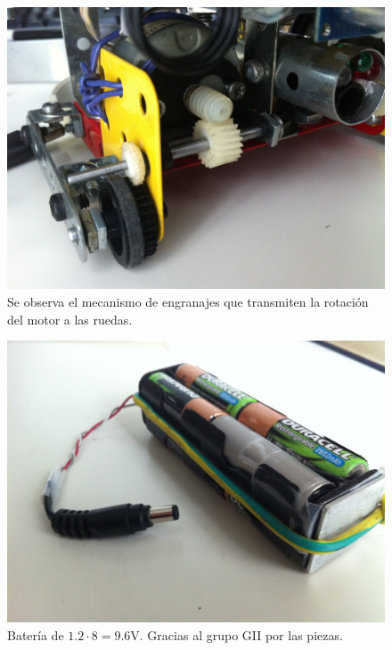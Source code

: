 \documentclass[10pt,a4paper,hidelinks,twocolumn,nobalancelastpage]{article}
\begin{document}
\begin{figure}[H]
\includegraphics[width=\columnwidth]{motor.jpg}
\caption{Se observa el mecanismo de engranajes que transmiten la rotación del 
motor a las ruedas. \label{fig:motor}}
\end{figure}

\begin{figure}[H]
\includegraphics[width=\columnwidth]{bateria.jpg}
\caption{Batería de $1.2 \cdot 8 = 9.6 \si{\V}$. Gracias al grupo GII por las 
piezas. \label{fig:bateria}}
\end{figure}
\end{document}
